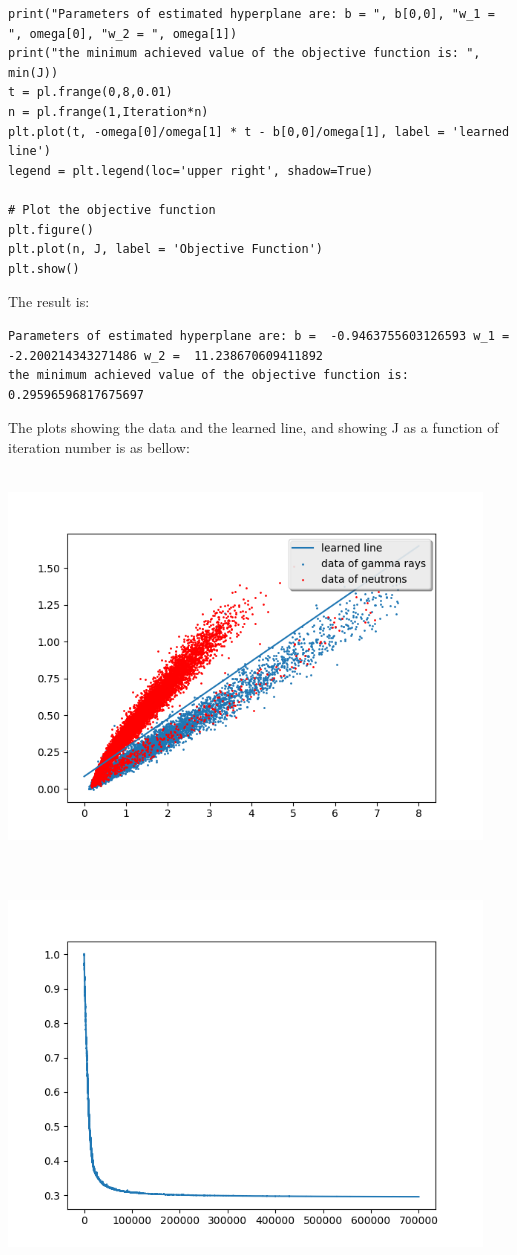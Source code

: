 \documentclass[letterpaper,11pt]{article}
\begin{document}
\begin{spacing}{1.2}
\begin{lstlisting}
print("Parameters of estimated hyperplane are: b = ", b[0,0], "w_1 = ", omega[0], "w_2 = ", omega[1])
print("the minimum achieved value of the objective function is: ", min(J))
t = pl.frange(0,8,0.01)
n = pl.frange(1,Iteration*n)
plt.plot(t, -omega[0]/omega[1] * t - b[0,0]/omega[1], label = 'learned line')
legend = plt.legend(loc='upper right', shadow=True)

# Plot the objective function
plt.figure()
plt.plot(n, J, label = 'Objective Function')
plt.show()
\end{lstlisting}
The result is:
\begin{lstlisting}
Parameters of estimated hyperplane are: b =  -0.9463755603126593 w_1 =  -2.200214343271486 w_2 =  11.238670609411892
the minimum achieved value of the objective function is:  0.29596596817675697
\end{lstlisting}

The plots showing the data and the learned line, and showing J as a function of iteration number is as bellow:

\includegraphics[width=4.95in,height=4.05in]{sto_sg_opt_smh.png}

\includegraphics[width=4.95in,height=4.05in]{sto_sg_opt_smh_J.png}

\end{spacing}
\end{document}
